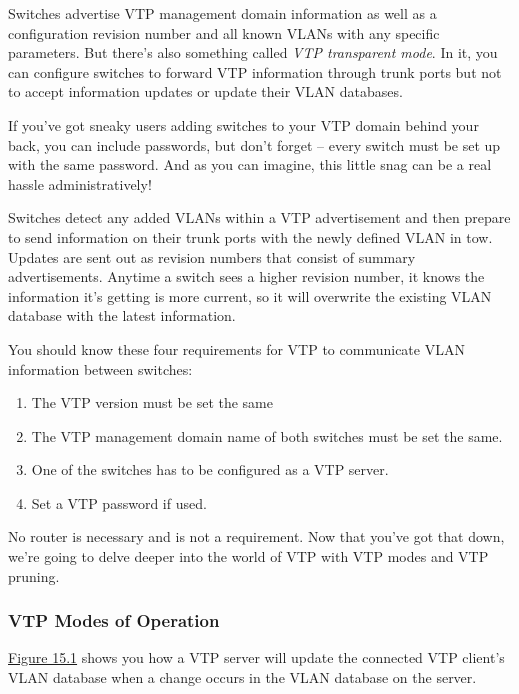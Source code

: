Switches advertise VTP management domain information as well as a
configuration revision number and all known VLANs with any specific
parameters. But there's also something called \emph{VTP transparent
mode}. In it, you can configure switches to forward VTP information
through trunk ports but not to accept information updates or update
their VLAN databases.

If you've got sneaky users adding switches to your VTP domain behind
your back, you can include passwords, but don't forget -- every switch
must be set up with the same password. And as you can imagine, this
little snag can be a real hassle administratively!

Switches detect any added VLANs within a VTP advertisement and then
prepare to send information on their trunk ports with the newly defined
VLAN in tow. Updates are sent out as revision numbers that consist of
summary advertisements. Anytime a switch sees a higher revision number,
it knows the information it's getting is more current, so it will
overwrite the existing VLAN database with the latest information.

You should know these four requirements for VTP to communicate VLAN
information between switches:

\begin{enumerate}
\tightlist
\item
  The VTP version must be set the same
\item
  The VTP management domain name of both switches must be set the same.
\item
  One of the switches has to be configured as a VTP server.
\item
  Set a VTP password if used.
\end{enumerate}

No router is necessary and is not a requirement. Now that you've got
that down, we're going to delve deeper into the world of VTP with VTP
modes and VTP pruning.

\subsubsection[VTP Modes of
Operation]{\texorpdfstring{\protect\hypertarget{c15.xhtmlux5cux23c15-sec-5}{}{}VTP
Modes of Operation}{VTP Modes of Operation}}

\protect\hyperlink{c15.xhtmlux5cux23figure15-1}{Figure 15.1} shows you
how a VTP server will update the connected VTP client's VLAN database
when a change occurs in the VLAN database on the server.

